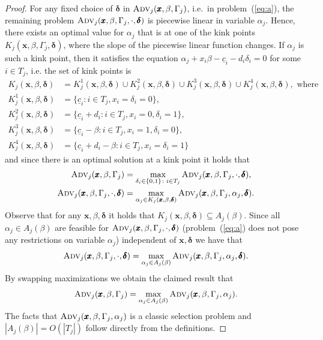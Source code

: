 \begin{proof}
  For any fixed choice of $\pmb{\delta}$ in $\textsc{Adv}_j(\pmb{x},\beta,\Gamma_j)$, i.e.\ in problem~(\ref{eq:a}), the remaining problem $\textsc{Adv}_j(\pmb{x},\beta,\Gamma_j, \cdot, \pmb{\delta})$ is piecewise linear in variable $\alpha_j$.
  Hence, there exists an optimal value for $\alpha_j$ that is at one of the kink points $K_j(\pmb{x}, \beta, \Gamma_j, \pmb{\delta})$, 
  where the slope of the piecewise linear function changes. 
  If $\alpha_j$ is such a kink point, then it satisfies the equation $\alpha_j + x_i \beta - \underline{c}_i - d_i\delta_i = 0$ for some $i \in T_j$,
  i.e. the set of kink points is
  \begin{align*}
  K_j(\pmb{x}, \beta, \pmb{\delta}) &= K_j^1(\pmb{x}, \beta, \pmb{\delta}) \cup K_j^2(\pmb{x}, \beta, \pmb{\delta}) \cup K_j^3(\pmb{x}, \beta, \pmb{\delta}) \cup K_j^4(\pmb{x}, \beta, \pmb{\delta}),\text{ where} \\
  K_j^1(\pmb{x}, \beta, \pmb{\delta}) &= \{\underline{c}_i \colon  i \in T_j, x_i = \delta_i = 0 \}, \\
  K_j^2(\pmb{x}, \beta, \pmb{\delta}) &= \{\underline{c}_i + d_i \colon  i \in T_j, x_i = 0, \delta_i = 1 \}, \\
  K_j^3(\pmb{x}, \beta, \pmb{\delta}) &= \{\underline{c}_i - \beta \colon i \in T_j, x_i = 1, \delta_i = 0 \}, \\
  K_j^4(\pmb{x}, \beta, \pmb{\delta}) &= \{\underline{c}_i +d_i - \beta \colon i \in T_j, x_i = \delta_i = 1 \}
  \end{align*}
  and since there is an optimal solution at a kink point it holds that
\begin{align*}
  \textsc{Adv}_j(\pmb{x},\beta,\Gamma_j) &= \max_{\delta_i \in \{0,1\} \colon i \in T_j} \textsc{Adv}_j(\pmb{x},\beta,\Gamma_j, \cdot, \pmb{\delta}),\\
   \textsc{Adv}_j(\pmb{x},\beta,\Gamma_j, \cdot, \pmb{\delta}) &= \max_{\alpha_j \in K_j(\pmb{x}, \beta, \pmb{\delta})} \textsc{Adv}_j(\pmb{x},\beta,\Gamma_j,\alpha_j, \pmb{\delta}).
\end{align*}
  Observe that for any $\pmb{x}, \beta, \pmb{\delta}$ it holds that $K_j(\pmb{x}, \beta, \pmb{\delta}) \subseteq A_j(\beta)$. 
  Since all $\alpha_j \in A_j(\beta)$ are feasible for $\textsc{Adv}_j(\pmb{x},\beta,\Gamma_j, \cdot, \pmb{\delta})$ (problem~(\ref{eq:a}) does not pose any restrictions on variable $\alpha_j$)
  independent of 
  $\pmb{x}, \pmb{\delta}$ we have that 
  \[ \textsc{Adv}_j(\pmb{x},\beta,\Gamma_j, \cdot, \pmb{\delta}) = \max_{\alpha_j \in A_j(\beta)} \textsc{Adv}_j(\pmb{x},\beta,\Gamma_j,\alpha_j, \pmb{\delta}). \]
  By swapping maximizations we obtain the claimed result that
  \[ \textsc{Adv}_j(\pmb{x},\beta,\Gamma_j) = \max_{\alpha_j \in A_j(\beta)} \textsc{Adv}_j(\pmb{x},\beta,\Gamma_j,\alpha_j). \]
  The facts that $\textsc{Adv}_j(\pmb{x},\beta,\Gamma_j,\alpha_j)$ is a classic selection problem and 
  $|A_j(\beta)| = O(|T_j|)$ follow directly from the definitions.
\end{proof}

